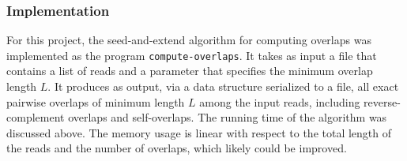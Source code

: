 \documentclass[12pt]{article}
\newcommand{\ProgramName}[1]{{\tt #1}}
\begin{document}
\subsubsection{Implementation}

For this project, the seed-and-extend algorithm for computing overlaps was
implemented as the program \ProgramName{compute-overlaps}.  It takes as input a
file that contains a list of reads and a parameter that specifies the minimum
overlap length $L$.  It produces as output, via a data structure serialized to a
file, all exact pairwise overlaps of minimum length $L$ among the input reads,
including reverse-complement overlaps and self-overlaps.  The running time of
the algorithm was discussed above.  The memory usage is linear with respect to
the total length of the reads and the number of overlaps, which likely could be
improved.
\end{document}
